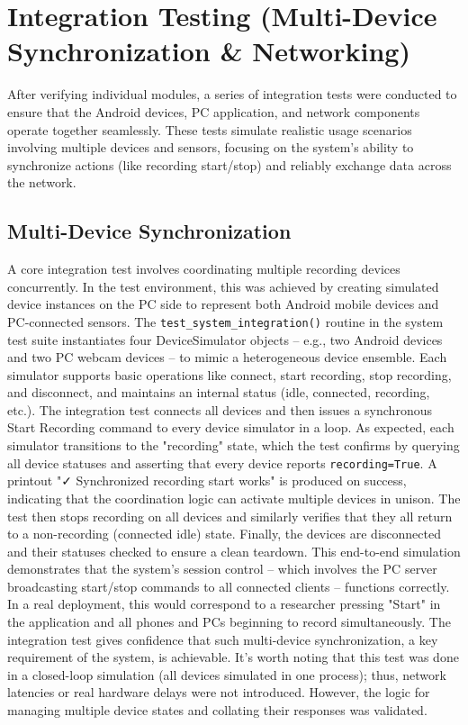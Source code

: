 \documentclass[11pt,a4paper]{report}
\begin{document}
\section{Integration Testing (Multi-Device Synchronization \& Networking)}

After verifying individual modules, a series of integration tests were conducted to ensure that the Android devices, PC application, and network components operate together seamlessly. These tests simulate realistic usage scenarios involving multiple devices and sensors, focusing on the system's ability to synchronize actions (like recording start/stop) and reliably exchange data across the network.

\subsection{Multi-Device Synchronization}

A core integration test involves coordinating multiple recording devices concurrently. In the test environment, this was achieved by creating simulated device instances on the PC side to represent both Android mobile devices and PC-connected sensors. The \texttt{test\_system\_integration()} routine in the system test suite instantiates four DeviceSimulator objects – e.g., two Android devices and two PC webcam devices – to mimic a heterogeneous device ensemble. Each simulator supports basic operations like connect, start recording, stop recording, and disconnect, and maintains an internal status (idle, connected, recording, etc.). The integration test connects all devices and then issues a synchronous Start Recording command to every device simulator in a loop. As expected, each simulator transitions to the "recording" state, which the test confirms by querying all device statuses and asserting that every device reports \texttt{recording=True}. A printout "✓ Synchronized recording start works" is produced on success, indicating that the coordination logic can activate multiple devices in unison. The test then stops recording on all devices and similarly verifies that they all return to a non-recording (connected idle) state. Finally, the devices are disconnected and their statuses checked to ensure a clean teardown. This end-to-end simulation demonstrates that the system's session control – which involves the PC server broadcasting start/stop commands to all connected clients – functions correctly. In a real deployment, this would correspond to a researcher pressing "Start" in the application and all phones and PCs beginning to record simultaneously. The integration test gives confidence that such multi-device synchronization, a key requirement of the system, is achievable. It's worth noting that this test was done in a closed-loop simulation (all devices simulated in one process); thus, network latencies or real hardware delays were not introduced. However, the logic for managing multiple device states and collating their responses was validated.
\end{document}
